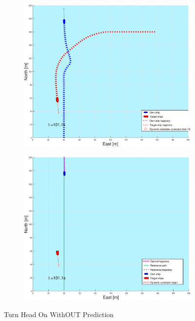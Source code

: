 \begin{figure}[ht]
\begin{subfigure}[b]{0.499\textwidth}
    \end{subfigure}
    \hfill
    \\
    \begin{subfigure}[b]{0.49\textwidth}
        \centering
        \includegraphics[width=\textwidth]{Images/Figures/sving_HO/_Simple_1fig1_time=101}
    \end{subfigure}
    \hfill
    \begin{subfigure}[b]{0.499\textwidth}
        \centering
        \includegraphics[width=\textwidth]{Images/Figures/sving_HO/_Simple_1fig999_time=101}
    \end{subfigure}
    \hfill
    \caption{Turn Head On WithOUT Prediction}
\end{figure}

